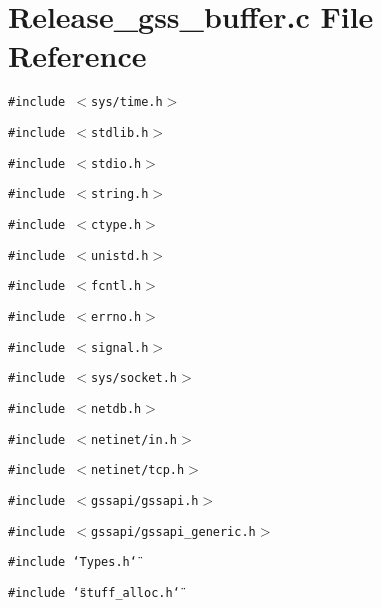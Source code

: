 \section{Release\_\-gss\_\-buffer.c File Reference}
\label{Release__gss__buffer_8c}
{\tt \#include $<$sys/time.h$>$}\par
{\tt \#include $<$stdlib.h$>$}\par
{\tt \#include $<$stdio.h$>$}\par
{\tt \#include $<$string.h$>$}\par
{\tt \#include $<$ctype.h$>$}\par
{\tt \#include $<$unistd.h$>$}\par
{\tt \#include $<$fcntl.h$>$}\par
{\tt \#include $<$errno.h$>$}\par
{\tt \#include $<$signal.h$>$}\par
{\tt \#include $<$sys/socket.h$>$}\par
{\tt \#include $<$netdb.h$>$}\par
{\tt \#include $<$netinet/in.h$>$}\par
{\tt \#include $<$netinet/tcp.h$>$}\par
{\tt \#include $<$gssapi/gssapi.h$>$}\par
{\tt \#include $<$gssapi/gssapi\_\-generic.h$>$}\par
{\tt \#include \char`\"{}Types.h\char`\"{}}\par
{\tt \#include \char`\"{}stuff\_\-alloc.h\char`\"{}}\par
